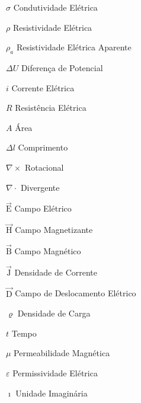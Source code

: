 \documentclass[12pt,twoside,oneright,a4paper,chapter=TITLE,english,brazil]{unipampa}
\newcommand{\vetor}[1]{\vec{\textrm{#1}}}
\begin{document}
\begin{simbolos}
    \item[$\sigma$]                  Condutividade Elétrica
    \item[$\rho$]                    Resistividade Elétrica
    \item[$\rho_a$]                  Resistividade Elétrica Aparente
    \item[$\Delta U$]                 Diferença de Potencial
    \item[$i$]                       Corrente Elétrica
    \item[$R$]                       Resistência Elétrica
    \item[$A$]                       Área
    \item[$\Delta l$]                Comprimento
    \item[$\nabla \times$]           Rotacional
    \item[$\nabla \cdot$]            Divergente
    \item[$\vetor{E}$]               Campo Elétrico
    \item[$\vetor{H}$]               Campo Magnetizante
    \item[$\vetor{B}$]               Campo Magnético
    \item[$\vetor{J}$]               Densidade de Corrente
    \item[$\vetor{D}$]               Campo de Deslocamento Elétrico
    \item[$\varrho$]                 Densidade de Carga
    \item[$t$]                       Tempo
    \item[$\mu$]                     Permeabilidade Magnética
    \item[$\varepsilon$]             Permissividade Elétrica
    \item[$\imath$]                  Unidade Imaginária                   
\end{simbolos}


\tableofcontents       %
\end{document}
